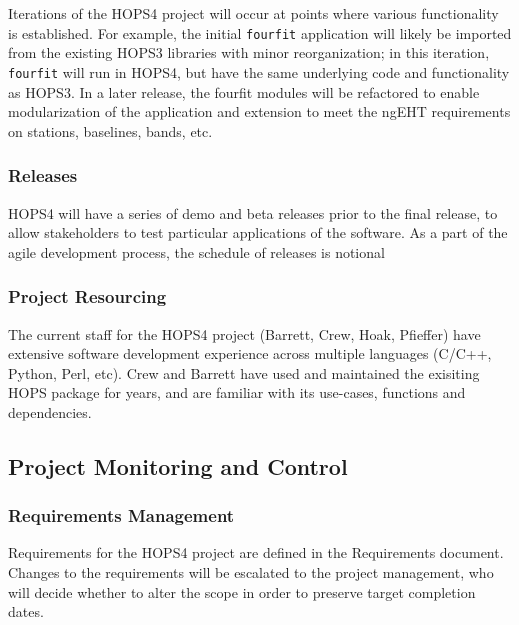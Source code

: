 Iterations of the HOPS4 project will occur at points where various functionality is established. For example, the initial \texttt{fourfit} application will likely be imported from the existing HOPS3 libraries with minor reorganization; in this iteration, \texttt{fourfit} will run in HOPS4, but have the same underlying code and functionality as HOPS3. In a later release, the fourfit modules will be refactored to enable modularization of the application and extension to meet the \ac{ngEHT} requirements on stations, baselines, bands, etc.


\subsubsection{Releases}


HOPS4 will have a series of demo and beta releases prior to the final release, to allow stakeholders to test particular applications of the software. As a part of the agile development process, the schedule of releases is notional


\subsubsection{Project Resourcing}

The current staff for the HOPS4 project (Barrett, Crew, Hoak, Pfieffer) have extensive software development experience across multiple languages (C/C++, Python, Perl, etc).  Crew and Barrett have used and maintained the exisiting HOPS package for years, and are familiar with its use-cases, functions and dependencies.

\subsection{Project Monitoring and Control}

\subsubsection{Requirements Management}

Requirements for the HOPS4 project are defined in the Requirements document. Changes to the requirements will be escalated to the project management, who will decide whether to alter the scope in order to preserve target completion dates.

